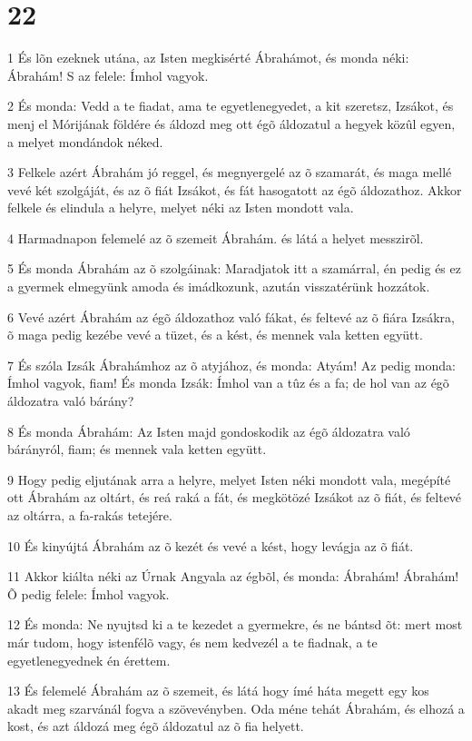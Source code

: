 \chapter{22}

\par 1 És lõn ezeknek utána, az Isten megkisérté Ábrahámot, és monda néki: Ábrahám! S az felele: Ímhol vagyok.
\par 2 És monda: Vedd a te fiadat, ama te egyetlenegyedet, a kit szeretsz, Izsákot, és menj el Mórijának földére és áldozd meg ott égõ áldozatul a hegyek közûl egyen, a melyet mondándok néked.
\par 3 Felkele azért Ábrahám jó reggel, és megnyergelé az õ szamarát, és maga mellé vevé két szolgáját, és az õ fiát Izsákot, és fát hasogatott az égõ áldozathoz. Akkor felkele és elindula a helyre, melyet néki az Isten mondott vala.
\par 4 Harmadnapon felemelé az õ szemeit Ábrahám. és látá a helyet messzirõl.
\par 5 És monda Ábrahám az õ szolgáinak: Maradjatok itt a szamárral, én pedig és ez a gyermek elmegyünk amoda és imádkozunk, azután visszatérünk hozzátok.
\par 6 Vevé azért Ábrahám az égõ áldozathoz való fákat, és feltevé az õ fiára Izsákra, õ maga pedig kezébe vevé a tüzet, és a kést, és mennek vala ketten együtt.
\par 7 És szóla Izsák Ábrahámhoz az õ atyjához, és monda: Atyám! Az pedig monda: Ímhol vagyok, fiam! És monda Izsák: Ímhol van a tûz és a fa; de hol van az égõ áldozatra való bárány?
\par 8 És monda Ábrahám: Az Isten majd gondoskodik az égõ áldozatra való bárányról, fiam; és mennek vala ketten együtt.
\par 9 Hogy pedig eljutának arra a helyre, melyet Isten néki mondott vala, megépíté ott Ábrahám az oltárt, és reá raká a fát, és megkötözé Izsákot az õ fiát, és feltevé az oltárra, a fa-rakás tetejére.
\par 10 És kinyújtá Ábrahám az õ kezét és vevé a kést, hogy levágja az õ fiát.
\par 11 Akkor kiálta néki az Úrnak Angyala az égbõl, és monda: Ábrahám! Ábrahám! Õ pedig felele: Ímhol vagyok.
\par 12 És monda: Ne nyujtsd ki a te kezedet a gyermekre, és ne bántsd õt: mert most már tudom, hogy istenfélõ vagy, és nem kedvezél a te fiadnak, a te egyetlenegyednek én érettem.
\par 13 És felemelé Ábrahám az õ szemeit, és látá hogy ímé háta megett egy kos akadt meg szarvánál fogva a szövevényben. Oda méne tehát Ábrahám, és elhozá a kost, és azt áldozá meg égõ áldozatul az õ fia helyett.
